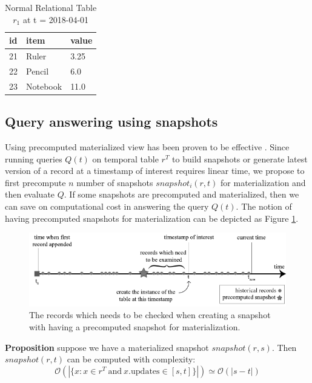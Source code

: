 \begin{center}
\begin{table}
	\centering
	\caption{Normal Relational Table $r_1$ at t = 2018-04-01}
	\label{table:normal_table_2_t}
	\begin{tabular}{p{4cm}p{4cm}p{4cm}}
		\hline
		id & item  & value  \\ \hline
		21 & Ruler & 3.25 \\
		22 & Pencil & 6.0   \\ 
		23 & Notebook & 11.0 \\ \hline
	\end{tabular}
\end{table}
\end{center}

\subsection{Query answering using snapshots} 

Using precomputed materialized view has been proven to be effective \cite{sohrabi2016materialized} \cite{du2017deepsea}. Since running queries $Q(t)$ on temporal table $r^T$ to build snapshots or generate latest version of a record at a timestamp of interest requires linear time, we propose to first precompute $n$ number of snapshots $snapshot_i(r,t)$ for materialization and then evaluate $Q$. If some snapshots are precomputed and materialized, then we can save on computational cost in answering the query $Q(t)$. The notion of having precomputed snapshots for materialization can be depicted as Figure \ref{fig:snapshot_materialization}.

\begin{figure}[t]
	\label{fig:snapshot_materialization}
	\centering
	\includegraphics[width=\textwidth]{figs/snapshot_materialization.pdf}
	\caption{The records which needs to be checked when creating a snapshot with having a precomputed snapshot for materialization.}
\end{figure}

\textbf{Proposition} suppose we have a materialized snapshot $snapshot(r,s)$. Then $snapshot(r,t)$ can be computed with complexity:
$$\mathcal{O}(|\{x: x\in r^T\mathrm{\ and\ } x.\mathrm{updates} \in [s,t]\}|) \simeq \mathcal{O}(|s-t|)$$

